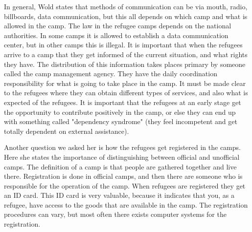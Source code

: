 In general, Wold states that methods of communication can be via mouth, radio, billboards, data communication, but this all depends on which camp and what is allowed in the camp. The law in the refugee camps depends on the national authorities. In some camps it is allowed to establish a data communication center, but in other camps this is illegal. It is important that when the refugees arrive to a camp that they get informed of the current situation, and what rights they have. The distribution of this information takes places primary by someone called the camp management agency. They have the daily coordination responsibility for what is going to take place in the camp. It must be made clear to the refugees where they can obtain different types of services, and also what is expected of the refugees. It is important that the refugees at an early stage get the opportunity to contribute positively in the camp, or else they can end up with something called "dependency syndrome" (they feel incompetent and get totally dependent on external assistance). 

Another question we asked her is how the refugees get registered in the camps. Here she states the importance of distinguishing between official and unofficial camps. The definition of a camp is that people are gathered together and live there. Registration is done in official camps, and then there are someone who is responsible for the operation of the camp. When refugees are registered they get an ID card. This ID card is very valuable, because it indicates that you, as a refugee, have access to the goods that are available in the camp. The registration procedures can vary, but most often there exists computer systems for the registration.


